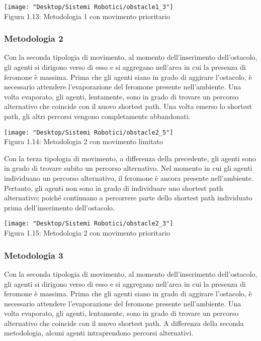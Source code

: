 \documentclass[12pt,a4paper,openright,twoside]{report}
\begin{document}
\begin{center}  
	\texttt{[image: "Desktop/Sistemi Robotici/obstacle1\_3"]}
	\\Figura 1.13: Metodologia 1 con movimento prioritario
\end{center}

\subsubsection{Metodologia 2}

Con la seconda tipologia di movimento, al momento dell'inserimento dell'ostacolo, gli agenti si dirigono verso di esso e si aggregano nell'area in cui la presenza di feromone è massima. Prima che gli agenti siano in grado di aggirare l'ostacolo, è necessario attendere l'evaporazione del feromone presente nell'ambiente. Una volta evaporato, gli agenti, lentamente, sono in grado di trovare un percorso alternativo che coincide con il nuovo shortest path. Una volta emerso lo shortest path, gli altri percorsi vengono completamente abbandonati.\\

\begin{center}  
	\texttt{[image: "Desktop/Sistemi Robotici/obstacle2\_5"]}
	\\Figura 1.14: Metodologia 2 con movimento limitato
\end{center}

Con la terza tipologia di movimento, a differenza della precedente, gli agenti sono in grado di trovare subito un percorso alternativo. Nel momento in cui gli agenti individuano un percorso alternativo, il feromone è ancora presente nell'ambiente. Pertanto, gli agenti non sono in grado di individuare uno shortest path alternativo; poiché continuano a percorrere parte dello shortest path individuato prima dell'inserimento dell'ostacolo.

\begin{center}  
	\texttt{[image: "Desktop/Sistemi Robotici/obstacle2\_3"]}
	\\Figura 1.15: Metodologia 2 con movimento prioritario
\end{center}

\subsubsection{Metodologia 3}
Con la seconda tipologia di movimento, al momento dell'inserimento dell'ostacolo, gli agenti si dirigono verso di esso e si aggregano nell'area in cui la presenza di feromone è massima. Prima che gli agenti siano in grado di aggirare l'ostacolo, è necessario attendere l'evaporazione del feromone presente nell'ambiente. Una volta evaporato, gli agenti, lentamente, sono in grado di trovare un percorso alternativo che coincide con il nuovo shortest path. A differenza della seconda metodologia, alcuni agenti intraprendono percorsi alternativi.\\
\end{document}
